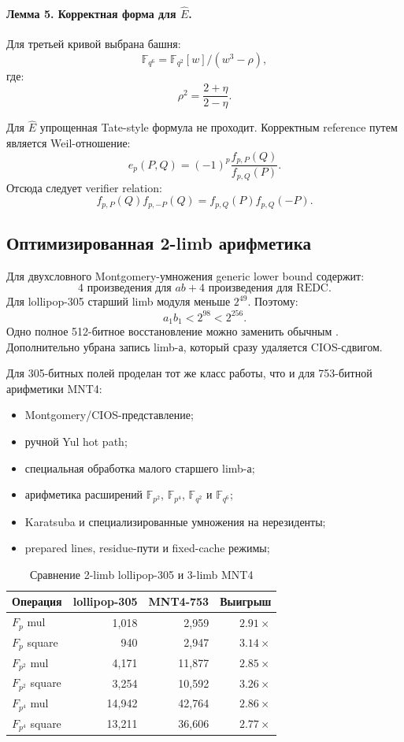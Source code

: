 \documentclass[12pt,a4paper]{article}
\newcommand{\code}[1]{\texttt{\detokenize{#1}}}
\begin{document}
\paragraph{Лемма 5. Корректная форма для $\widehat E$.}
Для третьей кривой выбрана башня:
\[
    \mathbb{F}_{q^6}
    =
    \mathbb{F}_{q^2}[w]/(w^3-\rho),
\]
где:
\[
    \rho^2=\frac{2+\eta}{2-\eta}.
\]

Для $\widehat E$ упрощенная Tate-style формула не проходит. Корректным
reference путем является Weil-отношение:
\[
    e_p(P,Q)
    =
    (-1)^p\frac{f_{p,P}(Q)}{f_{p,Q}(P)}.
\]
Отсюда следует verifier relation:
\[
    f_{p,P}(Q)f_{p,-P}(Q)
    =
    f_{p,Q}(P)f_{p,Q}(-P).
\]

\subsection{Оптимизированная 2-limb арифметика}

Для двухсловного Montgomery-умножения generic lower bound содержит:
\[
    4\text{ произведения для }ab+
    4\text{ произведения для REDC}.
\]
Для lollipop-305 старший limb модуля меньше $2^{49}$. Поэтому:
\[
    a_1b_1<2^{98}<2^{256}.
\]
Одно полное 512-битное восстановление можно заменить обычным \code{MUL}.
Дополнительно убрана запись limb-а, который сразу удаляется CIOS-сдвигом.

Для 305-битных полей проделан тот же класс работы, что и для 753-битной арифметики MNT4:
\begin{itemize}
    \item Montgomery/CIOS-представление;
    \item ручной Yul hot path;
    \item специальная обработка малого старшего limb-а;
    \item арифметика расширений $\mathbb{F}_{p^2}$,
    $\mathbb{F}_{p^4}$, $\mathbb{F}_{q^2}$ и $\mathbb{F}_{q^6}$;
    \item Karatsuba и специализированные умножения на нерезиденты;
    \item prepared lines, residue-пути и fixed-cache режимы;
\end{itemize}

\begin{table}[htbp]
\centering
\caption{Сравнение 2-limb lollipop-305 и 3-limb MNT4}
\small
\begin{tabular}{l r r r}
\toprule
Операция & lollipop-305 & MNT4-753 & Выигрыш \\
\midrule
$F_p$ mul & 1,018 & 2,959 & $2.91\times$ \\
$F_p$ square & 940 & 2,947 & $3.14\times$ \\
$F_{p^2}$ mul & 4,171 & 11,877 & $2.85\times$ \\
$F_{p^2}$ square & 3,254 & 10,592 & $3.26\times$ \\
$F_{p^4}$ mul & 14,942 & 42,764 & $2.86\times$ \\
$F_{p^4}$ square & 13,211 & 36,606 & $2.77\times$ \\
\bottomrule
\end{tabular}
\end{table}
\end{document}
